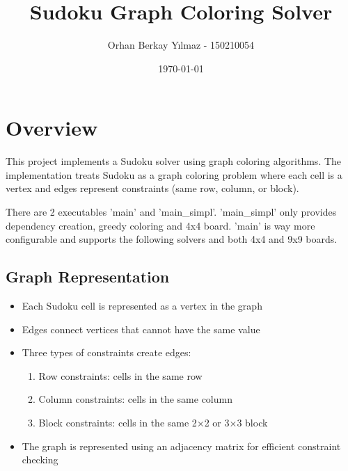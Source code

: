 \documentclass[11pt]{article}
\author{Orhan Berkay Yılmaz - 150210054}
\date{\today}
\title{Sudoku Graph Coloring Solver}
\begin{document}
\maketitle
\section{Overview}
\label{sec:org670de8a}
This project implements a Sudoku solver using graph coloring algorithms. The implementation treats Sudoku as a graph coloring problem where each cell is a vertex and edges represent constraints (same row, column, or block).

There are 2 executables 'main' and 'main\_simpl'. 'main\_simpl' only provides dependency creation, greedy coloring and 4x4 board. 'main' is way more configurable and supports the following solvers and both 4x4 and 9x9 boards.
\subsection{Graph Representation}
\label{sec:org5b06ec6}
\begin{itemize}
\item Each Sudoku cell is represented as a vertex in the graph
\item Edges connect vertices that cannot have the same value
\item Three types of constraints create edges:
\begin{enumerate}
\item Row constraints: cells in the same row
\item Column constraints: cells in the same column
\item Block constraints: cells in the same 2×2 or 3×3 block
\end{enumerate}
\item The graph is represented using an adjacency matrix for efficient constraint checking
\end{itemize}
\end{document}
